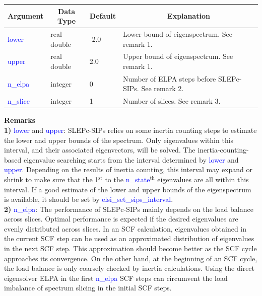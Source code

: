 \documentclass{report}
\begin{document}
\begin{tabular}[]{|p{30mm}|p{20mm}|p{15mm}|p{100mm}|}
\hline
\multicolumn{1}{|c|}{\textbf{Argument}} & \multicolumn{1}{c|}{\textbf{Data Type}} & \multicolumn{1}{c|}{\textbf{Default}} & \multicolumn{1}{c|}{\textbf{Explanation}}\\
\hline
\textcolor{blue}{lower}    & real double & -2.0 & Lower bound of eigenspectrum.  See remark 1.\\
\hline
\textcolor{blue}{upper}    & real double & 2.0  & Upper bound of eigenspectrum.  See remark 1.\\
\hline
\textcolor{blue}{n\_elpa}  & integer     & 0    & Number of ELPA steps before SLEPc-SIPs.  See remark 2.\\
\hline
\textcolor{blue}{n\_slice} & integer     & 1    & Number of slices.  See remark 3.\\
\hline
\end{tabular}

\bigskip
\textbf{Remarks}\\

\textbf{1)} \textcolor{blue}{lower} and \textcolor{blue}{upper}:  SLEPc-SIPs relies on some inertia counting steps to estimate the lower and upper bounds of the spectrum.  Only eigenvalues within this interval, and their associated eigenvectors, will be solved.  The inertia-counting-based eigenvalue searching starts from the interval determined by \textcolor{blue}{lower} and \textcolor{blue}{upper}.  Depending on the results of inertia counting, this interval may expand or shrink to make sure that the 1$^\text{st}$ to the \textcolor{blue}{n\_state}$^\text{th}$ eigenvalues are all within this interval.  If a good estimate of the lower and upper bounds of the eigenspectrum is available, it should be set by \textcolor{blue}{elsi\_set\_sips\_interval}.\\

\textbf{2)} \textcolor{blue}{n\_elpa}:  The performance of SLEPc-SIPs mainly depends on the load balance across slices.  Optimal performance is expected if the desired eigenvalues are evenly distributed across slices.  In an SCF calculation, eigenvalues obtained in the current SCF step can be used as an approximated distribution of eigenvalues in the next SCF step.  This approximation should become better as the SCF cycle approaches its convergence.  On the other hand, at the beginning of an SCF cycle, the load balance is only coarsely checked by inertia calculations.  Using the direct eigensolver ELPA in the first \textcolor{blue}{n\_elpa} SCF steps can circumvent the load imbalance of spectrum slicing in the initial SCF steps.\\
\end{document}
